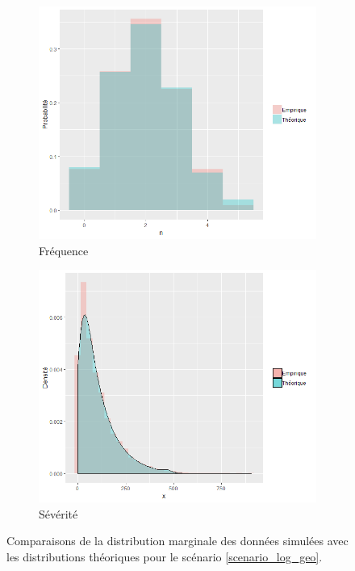 \documentclass{article}
\begin{document}
	\begin{figure}[H]
		\begin{subfigure}[l]{0.5\textwidth}
			\includegraphics[width=\textwidth]{Graph/log_geo_N.png}
			\caption{Fréquence}
		\end{subfigure}
		\begin{subfigure}[r]{0.5\textwidth}
			\includegraphics[width=\textwidth]{Graph/log_geo_X.png}
			\caption{Sévérité}
		\end{subfigure}
		\caption{Comparaisons de la distribution marginale des données simulées avec les distributions théoriques pour le scénario \ref{scenario_log_geo}.}
		\label{graph_densite_log_geo}
	\end{figure}
	
\end{document}
